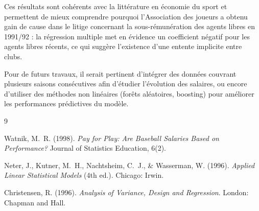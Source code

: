 \documentclass[11pt,a4paper]{article}
\begin{document}
Ces résultats sont cohérents avec la littérature en économie du sport et permettent de mieux comprendre pourquoi l’Association des joueurs a obtenu gain de cause dans le litige concernant la sous-rémunération des agents libres en 1991/92 : la régression multiple met en évidence un coefficient négatif pour les agents libres récents, ce qui suggère l’existence d’une entente implicite entre clubs.\vspace{0.3cm}

Pour de futurs travaux, il serait pertinent d’intégrer des données couvrant plusieurs saisons consécutives afin d’étudier l’évolution des salaires, ou encore d’utiliser des méthodes non linéaires (forêts aléatoires, boosting) pour améliorer les performances prédictives du modèle.\vspace{1cm}

\begin{thebibliography}{9}

Watnik, M.~R. (1998).
\textit{Pay for Play: Are Baseball Salaries Based on Performance?}
Journal of Statistics Education, 6(2).\vspace{0.3cm}

Neter, J., Kutner, M.~H., Nachtsheim, C.~J., \& Wasserman, W. (1996).
\textit{Applied Linear Statistical Models} (4th ed.).
Chicago: Irwin.\vspace{0.3cm}

Christensen, R. (1996).
\textit{Analysis of Variance, Design and Regression}.
London: Chapman and Hall.

\end{thebibliography}
\end{document}
